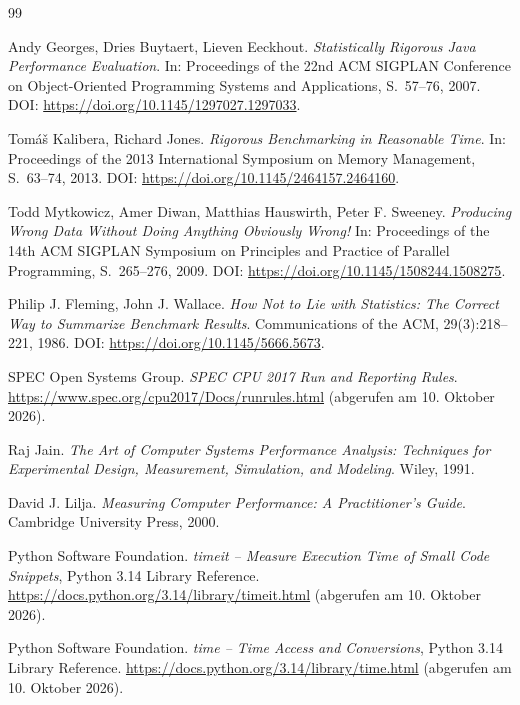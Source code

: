 \documentclass[a4paper,12pt, twoside]{report}
\theoremstyle{definition}
\begin{document}
\begin{thebibliography}{99}

Andy Georges, Dries Buytaert, Lieven Eeckhout.
\emph{Statistically Rigorous Java Performance Evaluation}.
In: Proceedings of the 22nd ACM SIGPLAN Conference on Object-Oriented Programming Systems and Applications, S.~57--76, 2007.
DOI: \url{https://doi.org/10.1145/1297027.1297033}.

Tom\'a\v{s} Kalibera, Richard Jones.
\emph{Rigorous Benchmarking in Reasonable Time}.
In: Proceedings of the 2013 International Symposium on Memory Management, S.~63--74, 2013.
DOI: \url{https://doi.org/10.1145/2464157.2464160}.

Todd Mytkowicz, Amer Diwan, Matthias Hauswirth, Peter F. Sweeney.
\emph{Producing Wrong Data Without Doing Anything Obviously Wrong!}
In: Proceedings of the 14th ACM SIGPLAN Symposium on Principles and Practice of Parallel Programming, S.~265--276, 2009.
DOI: \url{https://doi.org/10.1145/1508244.1508275}.

Philip J. Fleming, John J. Wallace.
\emph{How Not to Lie with Statistics: The Correct Way to Summarize Benchmark Results}.
Communications of the ACM, 29(3):218--221, 1986.
DOI: \url{https://doi.org/10.1145/5666.5673}.

SPEC Open Systems Group.
\emph{SPEC CPU 2017 Run and Reporting Rules}.
\url{https://www.spec.org/cpu2017/Docs/runrules.html} (abgerufen am 10. Oktober 2026).

Raj Jain.
\emph{The Art of Computer Systems Performance Analysis: Techniques for Experimental Design, Measurement, Simulation, and Modeling}.
Wiley, 1991.

David J. Lilja.
\emph{Measuring Computer Performance: A Practitioner's Guide}.
Cambridge University Press, 2000.

Python Software Foundation.
\emph{timeit -- Measure Execution Time of Small Code Snippets}, Python 3.14 Library Reference.
\url{https://docs.python.org/3.14/library/timeit.html} (abgerufen am 10. Oktober 2026).

Python Software Foundation.
\emph{time -- Time Access and Conversions}, Python 3.14 Library Reference.
\url{https://docs.python.org/3.14/library/time.html} (abgerufen am 10. Oktober 2026).

\end{thebibliography}
\end{document}
